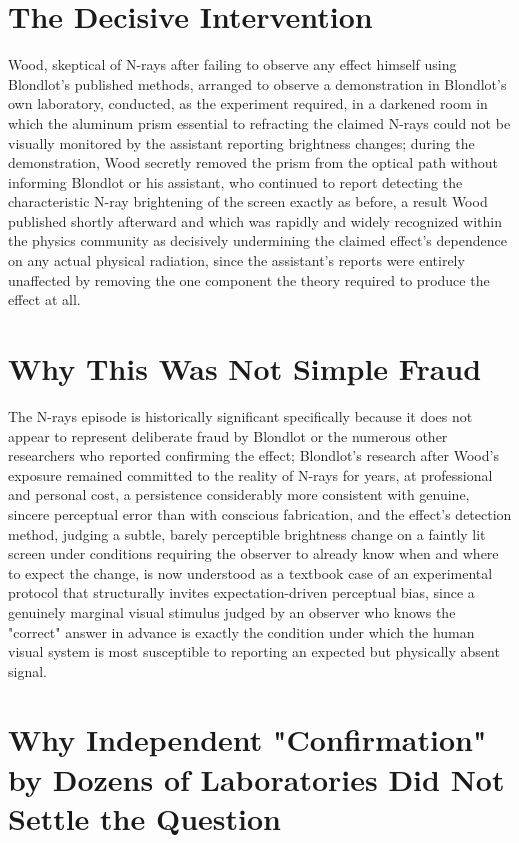 \documentclass[11pt]{article}
\begin{document}
\section{The Decisive Intervention}

Wood, skeptical of N-rays after failing to observe any effect himself using Blondlot's published methods, arranged to observe a demonstration in Blondlot's own laboratory, conducted, as the experiment required, in a darkened room in which the aluminum prism essential to refracting the claimed N-rays could not be visually monitored by the assistant reporting brightness changes; during the demonstration, Wood secretly removed the prism from the optical path without informing Blondlot or his assistant, who continued to report detecting the characteristic N-ray brightening of the screen exactly as before, a result Wood published shortly afterward and which was rapidly and widely recognized within the physics community as decisively undermining the claimed effect's dependence on any actual physical radiation, since the assistant's reports were entirely unaffected by removing the one component the theory required to produce the effect at all.

\section{Why This Was Not Simple Fraud}

The N-rays episode is historically significant specifically because it does not appear to represent deliberate fraud by Blondlot or the numerous other researchers who reported confirming the effect; Blondlot's research after Wood's exposure remained committed to the reality of N-rays for years, at professional and personal cost, a persistence considerably more consistent with genuine, sincere perceptual error than with conscious fabrication, and the effect's detection method, judging a subtle, barely perceptible brightness change on a faintly lit screen under conditions requiring the observer to already know when and where to expect the change, is now understood as a textbook case of an experimental protocol that structurally invites expectation-driven perceptual bias, since a genuinely marginal visual stimulus judged by an observer who knows the "correct" answer in advance is exactly the condition under which the human visual system is most susceptible to reporting an expected but physically absent signal.

\section{Why Independent "Confirmation" by Dozens of Laboratories Did Not Settle the Question}
\end{document}
